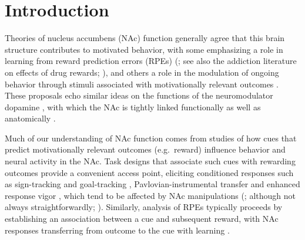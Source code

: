 \documentclass[11pt]{article}
\let\cite=\citep
\let\citeNP=\citealt
\begin{document}
\newpage

\section*{Introduction}

Theories of nucleus accumbens (NAc) function generally agree that this
brain structure contributes to motivated behavior, with some
emphasizing a role in learning from reward prediction errors (RPEs)
(\citeNP{Joel2002,Maia2009,Khamassi2012,Lee2012,Schultz2016,Averbeck2017};
see also the addiction literature on effects of drug rewards;
\citeNP{Kalivas2005,Hyman2006,Carelli2009}), and others a role in the
modulation of ongoing behavior through stimuli associated with
motivationally relevant outcomes \cite[invigorating,
  directing;][]{Nicola2010a,Salamone2012,Floresco2015}. These
proposals echo similar ideas on the functions of the neuromodulator
dopamine \cite{Maia2009,Berridge2012,Salamone2012,Schultz2016}, with
which the NAc is tightly linked functionally as well as anatomically
\cite{Cheer2007,Ikemoto2007,DuHoffmann2014,Takahashi2016}.

Much of our understanding of NAc function comes from studies of how
cues that predict motivationally relevant outcomes (e.g.\ reward)
influence behavior and neural activity in the NAc. Task designs that
associate such cues with rewarding outcomes provide a convenient
access point, eliciting conditioned responses such as sign-tracking and
goal-tracking \cite{hearst1974sign,Robinson2009},
Pavlovian-instrumental transfer \cite{Estes1943,Rescorla1967} and
enhanced response vigor \cite{Niv2007,Nicola2010a}, which tend to be
affected by NAc manipulations
(\citeNP{Corbit2011,Flagel2011,Chang2012}; although not always
straightforwardly; \citeNP{Giertler2004,Chang2013}). Similarly,
analysis of RPEs typically proceeds by establishing an association
between a cue and subsequent reward, with NAc responses transferring
from outcome to the cue with learning
\cite{Schultz1997,Setlow2003,Roitman2005,Day2007a}.
\end{document}
